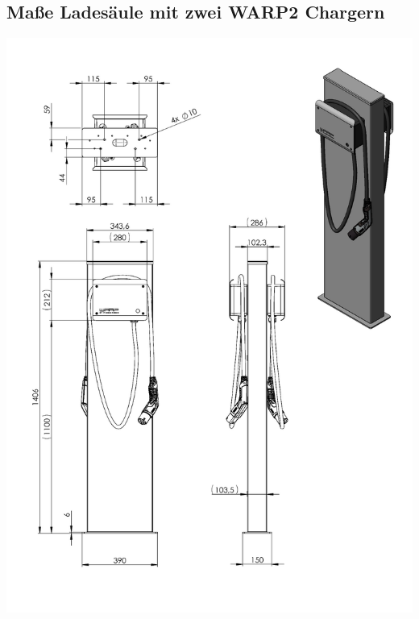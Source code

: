 \documentclass[a4paper,10pt]{article}
\begin{document}
	\subsection*{Maße Ladesäule mit zwei WARP2 Chargern}
	\label{appendix_stand2}
	\begin{center}
		\includegraphics[width=0.9\linewidth]{./img/stand_2}
	\end{center}
\end{document}
